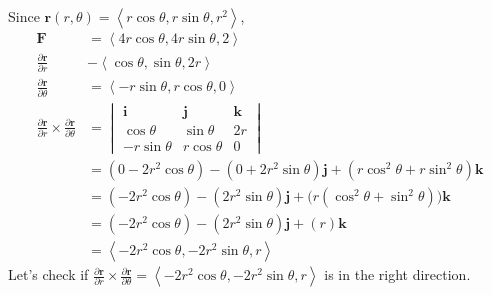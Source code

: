 \documentclass{article}
\newcommand{\lrp}[1]{\left( #1 \right)}
\newcommand{\lra}[1]{\left\langle #1 \right\rangle}
\renewcommand{\i}[0]{\mathbf{i}}
\renewcommand{\j}[0]{\mathbf{j}}
\renewcommand{\k}[0]{\mathbf{k}}
\renewcommand{\r}[0]{\mathbf{r}}
\newcommand{\F}[0]{\mathbf{F}}
\begin{document}
Since $\r(r,\theta)=\lra{r\cos\theta, r\sin\theta, r^2}$,
\begin{align*}
    \F &= \lra{4r\cos\theta, 4r\sin\theta, 2}\\
    \frac{\partial \r}{\partial r}&-\lra{\cos\theta, \sin\theta, 2r}\\
    \frac{\partial \r}{\partial \theta}&=\lra{-r\sin\theta, r\cos\theta, 0}\\
     \frac{\partial \r}{\partial r}\times \frac{\partial \r}{\partial \theta}&=\begin{vmatrix}\i & \j & \k\\
     \cos \theta & \sin\theta & 2r\\
     -r\sin\theta & r\cos\theta & 0\end{vmatrix}\\
     &=\lrp{0-2r^2\cos\theta}-\lrp{0+2r^2\sin\theta}\j +\lrp{r\cos^2\theta+r\sin^2\theta}\k\\
     &=\lrp{-2r^2\cos\theta}-\lrp{2r^2\sin\theta}\j +\big(r\lrp{\cos^2\theta+\sin^2\theta}\big)\k\\
     &=\lrp{-2r^2\cos\theta}-\lrp{2r^2\sin\theta}\j+\lrp{r}\k\tag{$\cos^2\theta+\sin^2\theta=1$}\\
     &=\lra{-2r^2\cos\theta,-2r^2\sin\theta, r}
     \end{align*}
Let's check if $\displaystyle \frac{\partial \r}{\partial r}\times  \frac{\partial \r }{\partial \theta}=\lra{-2r^2\cos\theta,-2r^2\sin\theta, r}$ is in the right direction.
\end{document}
